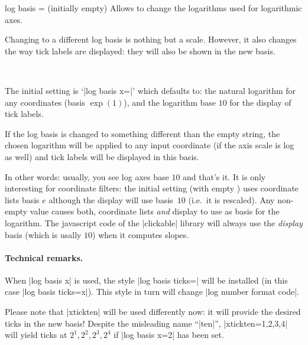 \begin{pgfplotsxykey}{log basis \x= (initially empty)}
	Allows to change the logarithms used for logarithmic axes.

	Changing to a different log basis is nothing but a scale. However, it also changes the way tick labels are displayed: they will also be shown in the new basis.

\begin{codeexample}[]
~
\end{codeexample}
	
	The initial setting is `|log basis x=|' which defaults to: the natural logarithm for any coordinates (basis $\exp(1)$), and the logarithm base $10$ for the display of tick labels.

	If the log basis is changed to something different than the empty string, the chosen logarithm will be applied to any input coordinate (if the axis scale is log as well) and tick labels will be displayed in this basis. 

	In other words: usually, you see log axes base $10$ and that's it. It is only interesting for coordinate filters: 
	the initial setting (with empty ) uses coordinate lists basis $e$ although the display will use basis~$10$ (i.e.\ it is rescaled). Any non-empty value  causes both, coordinate lists \emph{and} display to use  as basis for the logarithm. The javascript code of the |clickable| library will always use the \emph{display} basis (which is usally $10$) when it computes slopes.

	\paragraph{Technical remarks.} When |log basis x| is used, the style |log basis ticks=| will be installed (in this case |log basis ticks=x|). This style in turn will change |log number format code|.

	Please note that |xtickten| will be used differently now: it will provide the desired ticks in the new basis! Despite the misleading name ``|ten|'', |xtickten={1,2,3,4}| will yield ticks at $2^1,2^2,2^3,2^4$ if |log basis x=2| has been set.
\end{pgfplotsxykey}
